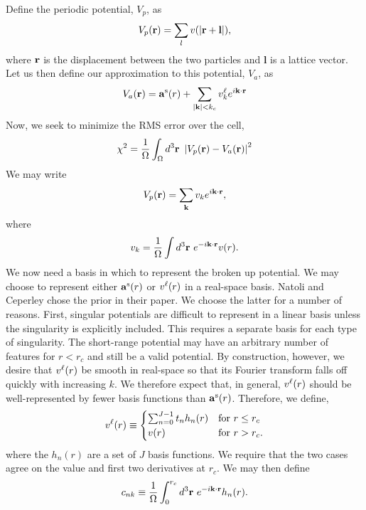 Define the periodic potential, $V_p$, as 
\begin{equation}
V_p(\mathbf{r}) = \sum_l v(|\mathbf{r} + \mathbf{l}|),
\end{equation}
where $\mathbf{r}$ is the displacement between the two particles and
$\mathbf{l}$ is a lattice vector.  Let us then define our
approximation to this potential, $V_a$, as
\begin{equation}
V_a(\mathbf{r}) = \mathbf{a}^{\text{s}}(r) + \sum_{|\mathbf{k}| < k_c} v^\ell_k e^{i\mathbf {\mathbf{k}} \cdot \mathbf{r}}
\end{equation}
Now, we seek to minimize the RMS error over the cell,
\begin{equation}
\chi^2 = \frac{1}{\Omega}\int_\Omega d^3 \mathbf{r} \ 
\left| V_p(\vr) - V_a(\vr)\right|^2 
\end{equation}
We may write
\begin{equation}
V_p(\mathbf{r}) = \sum_{\mathbf{k}} v_k e^{i \mathbf{k} \cdot \mathbf{r}},
\end{equation}
where 
\begin{equation}
v_k = \frac{1}{\Omega} \int d^3\mathbf{r} \ e^{-i\mathbf{k}\cdot\mathbf{r}}v(r).
\end{equation}
We now need a basis in which to represent the broken up potential.  We
may choose to represent either $\mathbf{a}^{\text{s}}(r)$ or $v^\ell(r)$ in a real-space
basis.  Natoli and Ceperley chose the prior in their paper.  We choose
the latter for a number of reasons.  First, singular potentials are
difficult to represent in a linear basis unless the singularity is
explicitly included.  This requires a separate basis for each type of
singularity.  The short-range potential may have an arbitrary number
of features for $r<r_c$ and still be a valid potential.  By
construction, however, we desire that $v^\ell(r)$ be smooth in real-space
so that its Fourier transform falls off quickly with increasing $k$.
We therefore expect that, in general, $v^\ell(r)$ should be
well-represented by fewer basis functions than $\mathbf{a}^{\text{s}}(r)$.  Therefore,
we define,
\begin{equation}
v^\ell(r) \equiv
\begin{cases}
 \sum_{n=0}^{J-1} t_n h_n(r) & \text{for } r \le r_c \\
 v(r) & \text{for } r > r_c.
\end{cases}
\end{equation}
where the $h_n(r)$ are a set of $J$ basis functions.  We require that
the two cases agree on the value and first two derivatives at $r_c$.
We may then define
\begin{equation}
c_{nk} \equiv \frac{1}{\Omega} \int_0^{r_c} d^3 \mathbf{r} \ e^{-i\mathbf{k}\cdot\mathbf{r}} h_n(r).
\end{equation}
